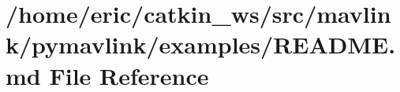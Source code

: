 \hypertarget{mavlink_2pymavlink_2examples_2README_8md}{}\section{/home/eric/catkin\+\_\+ws/src/mavlink/pymavlink/examples/\+R\+E\+A\+D\+ME.md File Reference}
\label{mavlink_2pymavlink_2examples_2README_8md}
